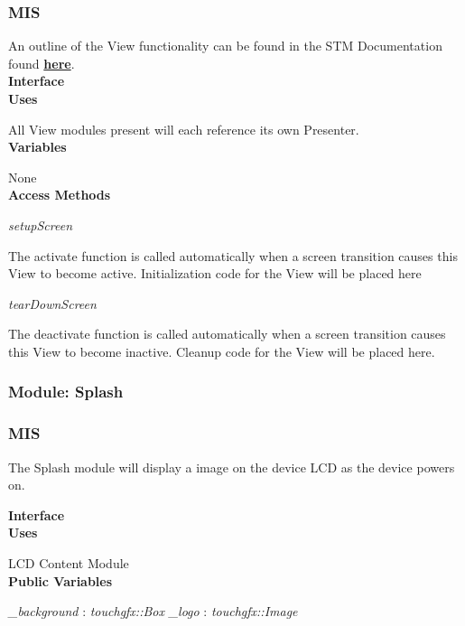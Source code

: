 \documentclass[12pt,titlepage]{article}
\begin{document}
\subsubsection*{MIS}

\noindent An outline of the View functionality can be found in the STM Documentation found \textbf{\href{https://support.touchgfx.com/docs/development/ui-development/software-architecture/screen-definition-and-mvp/#model}{here}}. \\

\noindent \textbf{Interface} \\

\noindent \textbf{Uses}

\noindent All View modules present will each reference its own Presenter. \\

\noindent \textbf{Variables}

\noindent None \\

\noindent \textbf{Access Methods}

\textit{setupScreen} \par
The activate function is called automatically when a screen transition causes this View to become active. Initialization code for the View will be placed here

\textit{tearDownScreen} \par
The deactivate function is called automatically when a screen transition causes this View to become inactive. Cleanup code for the View will be placed here.


\subsubsection{Module: Splash}
\subsubsection*{MIS}

\noindent The Splash module will display a image on the device LCD as the device powers on. 

\noindent \textbf{Interface} \\

\noindent \textbf{Uses}

\noindent LCD Content Module \\

\noindent \textbf{Public Variables}

\noindent \textit{\_background} : \textit{touchgfx::Box} \newline
\noindent \textit{\_logo} : \textit{touchgfx::Image} \newline
\end{document}
